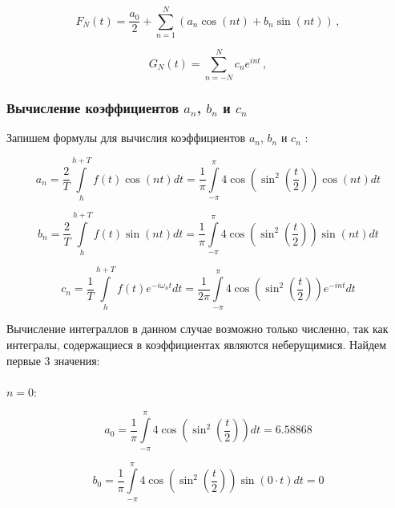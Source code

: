 \documentclass[a5paper, 10pt]{article}
\theoremstyle{definition}
\theoremstyle{plain}
\theoremstyle{remark}
\begin{document}
\begin{equation}
F_N(t) = \frac{a_0}{2} + \sum  \limits_{n=1}^N \left( a_n \cos \left( n t \right) + b_n \sin \left( n t \right)  \right) \, ,
\end{equation}

\begin{equation}
G_N (t) = \sum  \limits_{n=-N}^N c_n e^{i n t} \, ,
\end{equation}

\subsubsection{Вычисление коэффициентов $a_n$, $b_n$ и $c_n$}
Запишем формулы для вычислия коэффициентов $a_n$, $b_n$ и $c_n$ :

\begin{equation}
a_n = \frac{2}{T} \int \limits_{h}^{h + T} f(t) \cos (nt) dt =  \frac{1}{\pi}\int \limits_{-\pi}^{\pi} 4 \cos \left( \sin^2 \left( \frac{t}{2}\right) \right) \cos (nt) dt 
\end{equation}

\begin{equation}
b_n = \frac{2}{T} \int \limits_{h}^{h + T} f(t) \sin (nt) dt =  \frac{1}{\pi}\int \limits_{-\pi}^{\pi} 4 \cos \left( \sin^2 \left( \frac{t}{2}\right) \right) \sin (nt) dt 
\end{equation}

\begin{equation}
c_n = \frac{1}{T} \int \limits_{h}^{h + T} f(t) e^{-i \omega_n t} dt = \frac{1}{2 \pi} \int \limits_{-\pi}^{\pi} 4 \cos \left( \sin^2 \left( \frac{t}{2}\right) \right) e^{-i n t} dt 
\end{equation}

Вычисление интеграллов в данном случае возможно только численно, так как интегралы, содержащиеся в коэффициентах являются неберущимися. Найдем первые 3 значения:\\
\\
$n = 0:$

\begin{equation}
a_0 = \frac{1}{\pi}\int \limits_{-\pi}^{\pi} 4 \cos \left( \sin^2 \left( \frac{t}{2}\right) \right) dt = 6.58868
\end{equation}

\begin{equation}
b_0 =  \frac{1}{\pi}\int \limits_{-\pi}^{\pi} 4 \cos \left( \sin^2 \left( \frac{t}{2}\right) \right) \sin (0 \cdot t) dt = 0
\end{equation}
\end{document}
